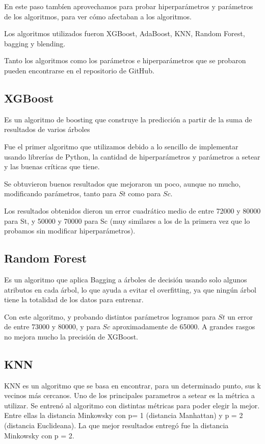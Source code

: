 \documentclass{article}
\begin{document}
En este paso tambíen aprovechamos para probar hiperparámetros y parámetros de los algoritmos, para ver cómo afectaban a los algoritmos.

Los algoritmos utilizados fueron XGBoost, AdaBoost, KNN, Random Forest, bagging y blending.

Tanto los algoritmos como los parámetros e hiperparámetros que se probaron pueden encontrarse en el repositorio de GitHub.

\subsection{XGBoost}
Es un algoritmo de boosting que construye la predicción a partir de la suma de resultados de varios árboles

Fue el primer algoritmo que utilizamos debido a lo sencillo de implementar usando librerías de Python, la cantidad de hiperparámetros y parámetros a setear y las buenas críticas que tiene.

Se obtuvieron buenos resultados que mejoraron un poco, aunque no mucho, modificando parámetros, tanto para $St$ como para $Sc$.

Los resultados obtenidos dieron un error cuadrático medio de entre 72000 y 80000 para St, y 50000 y 70000 para Sc (muy similares a los de la primera vez que lo probamos sin modificar hiperparámetros).

\subsection{Random Forest}
Es un algoritmo que aplica Bagging a árboles de decisión usando solo algunos atributos en cada árbol, lo que ayuda a evitar el overfitting, ya que ningún árbol tiene la totalidad de los datos para entrenar.

Con este algoritmo, y probando distintos parámetros logramos para $St$ un error de entre 73000 y 80000, y para $Sc$ aproximadamente de 65000. A grandes rasgos no mejora mucho la precisión de XGBoost.

\subsection{KNN}
KNN es un algoritmo que se basa en encontrar, para un determinado punto, sus k vecinos más cercanos.
Uno de los principales parametros a setear es la métrica a utilizar. Se entrenó al algoritmo con distintas métricas para poder elegir la mejor. Entre ellas la distancia Minkowsky con p= 1 (distancia Manhattan) y p = 2 (distancia Euclideana). La que mejor resultados entregó fue la distancia Minkowsky con p = 2.
\end{document}
